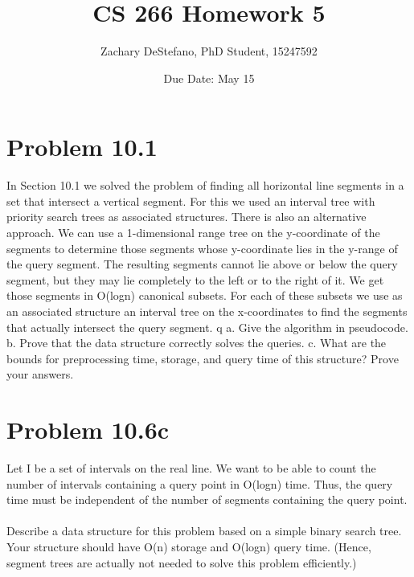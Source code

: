 \documentclass[11pt,psfig]{article}
\begin{document}
\setlength{\parskip}{1.2ex plus0.3ex minus 0.3ex}


\thispagestyle{empty} \pagestyle{myheadings} 



\title{CS 266 Homework 5}
\author{Zachary DeStefano, PhD Student, 15247592}
\date{Due Date: May 15}

\maketitle

\vfill\eject

\section*{Problem 10.1}

In Section 10.1 we solved the problem of finding all horizontal line
segments in a set that intersect a vertical segment. For this we used an
interval tree with priority search trees as associated structures. There
is also an alternative approach. We can use a 1-dimensional range tree
on the y-coordinate of the segments to determine those segments whose
y-coordinate lies in the y-range of the query segment. The resulting
segments cannot lie above or below the query segment, but they may
lie completely to the left or to the right of it. We get those segments
in O(logn) canonical subsets. For each of these subsets we use as an
associated structure an interval tree on the x-coordinates to find the
segments that actually intersect the query segment.
q
a. Give the algorithm in pseudocode.
b. Prove that the data structure correctly solves the queries.
c. What are the bounds for preprocessing time, storage, and query time
of this structure? Prove your answers.

\section*{Problem 10.6c}

Let I be a set of intervals on the real line. We want to be able to count the
number of intervals containing a query point in O(logn) time. Thus, the
query time must be independent of the number of segments containing
the query point.\\
\\
Describe a data structure for this problem based on a simple binary
search tree. Your structure should have O(n) storage and O(logn)
query time. (Hence, segment trees are actually not needed to solve
this problem efficiently.)
\end{document}
